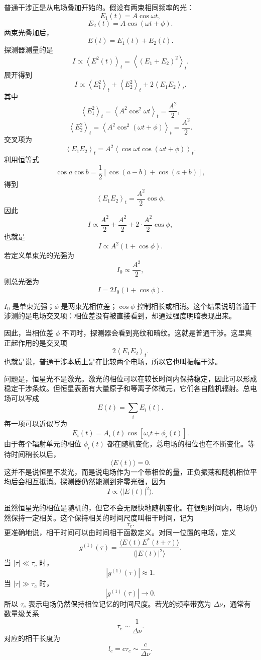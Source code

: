 普通干涉正是从电场叠加开始的。假设有两束相同频率的光：
\[
  E_1(t)=A\cos\omega t,
\]
\[
  E_2(t)=A\cos(\omega t+\phi).
\]
两束光叠加后，
\[
  E(t)=E_1(t)+E_2(t).
\]
探测器测量的是
\[
  I\propto \left\langle E^2(t)\right\rangle_t
  =
  \left\langle \left(E_1+E_2\right)^2\right\rangle_t.
\]
展开得到
\[
  I
  \propto
  \left\langle E_1^2\right\rangle_t
  +
  \left\langle E_2^2\right\rangle_t
  +
  2\left\langle E_1E_2\right\rangle_t.
\]
其中
\[
  \left\langle E_1^2\right\rangle_t
  =
  \left\langle A^2\cos^2\omega t\right\rangle_t
  =
  \frac{A^2}{2},
\]
\[
  \left\langle E_2^2\right\rangle_t
  =
  \left\langle A^2\cos^2(\omega t+\phi)\right\rangle_t
  =
  \frac{A^2}{2}.
\]
交叉项为
\[
  \left\langle E_1E_2\right\rangle_t
  =
  A^2\left\langle
  \cos\omega t\cos(\omega t+\phi)
  \right\rangle_t.
\]
利用恒等式
\[
  \cos a\cos b
  =
  \frac{1}{2}\left[\cos(a-b)+\cos(a+b)\right],
\]
得到
\[
  \left\langle E_1E_2\right\rangle_t
  =
  \frac{A^2}{2}\cos\phi.
\]
因此
\[
  I
  \propto
  \frac{A^2}{2}
  +
  \frac{A^2}{2}
  +
  2\cdot \frac{A^2}{2}\cos\phi,
\]
也就是
\[
  I
  \propto
  A^2(1+\cos\phi).
\]
若定义单束光的光强为
\[
  I_0\propto \frac{A^2}{2},
\]
则总光强为
\[
  I
  =
  2I_0(1+\cos\phi).
\]
\begin{formulaexplain}[普通干涉解读]
\(I_0\) 是单束光强；\(\phi\) 是两束光相位差；\(\cos\phi\) 控制相长或相消。这个结果说明普通干涉测的是电场交叉项：相位差没有被直接看到，却通过强度明暗表现出来。
\end{formulaexplain}
因此，当相位差 \(\phi\) 不同时，探测器会看到亮纹和暗纹。这就是普通干涉。这里真正起作用的是交叉项
\[
  2\left\langle E_1E_2\right\rangle_t.
\]
也就是说，普通干涉本质上是在比较两个电场，所以它也叫振幅干涉。

问题是，恒星光不是激光。激光的相位可以在较长时间内保持稳定，因此可以形成稳定干涉条纹。但恒星表面有大量原子和等离子体微元，它们各自随机辐射。总电场可以写成
\[
  E(t)=\sum_i E_i(t).
\]
每一项可以近似写为
\[
  E_i(t)=A_i(t)\cos[\omega_i t+\phi_i(t)].
\]
由于每个辐射单元的相位 \(\phi_i(t)\) 都在随机变化，总电场的相位也在不断变化。等待时间稍长以后，
\[
  \langle E(t)\rangle=0.
\]
这并不是说恒星不发光，而是说电场作为一个带相位的量，正负振荡和随机相位平均后会相互抵消。探测器仍然能测到非零光强，因为
\[
  I\propto \langle |E(t)|^2\rangle.
\]

虽然恒星光的相位是随机的，但它不会无限快地随机变化。在很短时间内，电场仍然保持一定相关。这个保持相关的时间尺度叫相干时间，记为
\[
  \tau_c.
\]
更准确地说，相干时间可以由时间相干函数定义。对同一位置的电场，定义
\[
  g^{(1)}(\tau)
  =
  \frac{
    \langle E(t)E^\ast(t+\tau)\rangle
  }{
    \langle |E(t)|^2\rangle
  }.
\]
当 \(|\tau|\ll \tau_c\) 时，
\[
  |g^{(1)}(\tau)|\approx 1.
\]
当 \(|\tau|\gg \tau_c\) 时，
\[
  |g^{(1)}(\tau)|\rightarrow 0.
\]
所以 \(\tau_c\) 表示电场仍然保持相位记忆的时间尺度。若光的频率带宽为 \(\Delta \nu\)，通常有数量级关系
\[
  \tau_c\sim \frac{1}{\Delta \nu}.
\]
对应的相干长度为
\[
  l_c=c\tau_c\sim \frac{c}{\Delta \nu}.
\]

